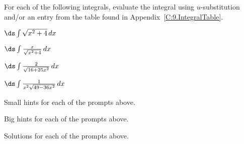 \begin{activity} \label{A:5.5.2} For each of the following integrals, evaluate the integral using $u$-substitution and/or an entry from the table found in Appendix~\ref{C:9.IntegralTable}.

\ba
	\item $\ds \int \sqrt{x^2 + 4} \, dx$

	\item $\ds \int \frac{x}{\sqrt{x^2 +4}} \, dx$
	
	\item $\ds \int \frac{2}{\sqrt{16+25x^2}}\, dx$
	
	\item $\ds \int \frac{1}{x^2 \sqrt{49-36x^2}} \, dx$
	
\ea

\end{activity}
\begin{smallhint}
\ba
	\item Small hints for each of the prompts above.
\ea
\end{smallhint}
\begin{bighint}
\ba
	\item Big hints for each of the prompts above.
\ea
\end{bighint}
\begin{activitySolution}
\ba
	\item Solutions for each of the prompts above.
\ea
\end{activitySolution}
\aftera